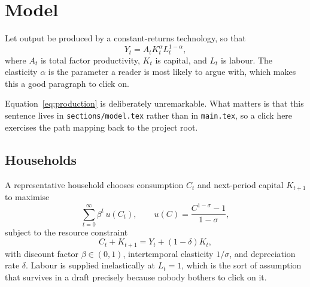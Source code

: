 \section{Model}

Let output be produced by a constant-returns technology, so that
\begin{equation}
  Y_{t} = A_{t} K_{t}^{\alpha} L_{t}^{1 - \alpha},
  \label{eq:production}
\end{equation}
where $A_{t}$ is total factor productivity, $K_{t}$ is capital, and $L_{t}$ is
labour. The elasticity $\alpha$ is the parameter a reader is most likely to
argue with, which makes this a good paragraph to click on.

Equation~\eqref{eq:production} is deliberately unremarkable. What matters is
that this sentence lives in \texttt{sections/model.tex} rather than in
\texttt{main.tex}, so a click here exercises the path mapping back to the
project root.

\subsection{Households}

A representative household chooses consumption $C_{t}$ and next-period capital
$K_{t+1}$ to maximise
\begin{equation}
  \sum_{t = 0}^{\infty} \beta^{t} \, u(C_{t}),
  \qquad
  u(C) = \frac{C^{1 - \sigma} - 1}{1 - \sigma},
  \label{eq:utility}
\end{equation}
subject to the resource constraint
\begin{equation}
  C_{t} + K_{t+1} = Y_{t} + (1 - \delta) K_{t},
  \label{eq:budget}
\end{equation}
with discount factor $\beta \in (0, 1)$, intertemporal elasticity $1 / \sigma$,
and depreciation rate $\delta$. Labour is supplied inelastically at $L_{t} = 1$,
which is the sort of assumption that survives in a draft precisely because
nobody bothers to click on it.

